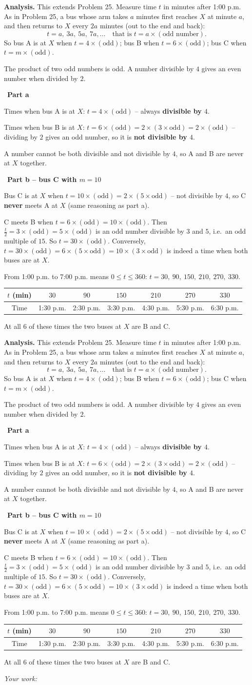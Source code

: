 \documentclass[11pt]{article}
\newif\ifsol \soltrue
\newcommand{\probsol}[1]{%
  \begin{lrbox}{\solmeasure}\begin{minipage}{\dimexpr\linewidth-24pt\relax}#1\end{minipage}\end{lrbox}%
  \ifsol
    \begin{solbox}#1\end{solbox}%
  \else
    \setlength{\solht}{\dimexpr\ht\solmeasure+\dp\solmeasure+0.85cm\relax}%
    \ifdim\solht<1.35cm\setlength{\solht}{1.35cm}\fi
    \ifdim\solht>\StudentMaxWork\setlength{\solht}{\StudentMaxWork}\fi
    \begin{tcolorbox}[colback=white,colframe=Line,boxrule=0.8pt,arc=5pt,
      left=8pt,right=8pt,top=4pt,bottom=4pt,height=\solht]{\footnotesize\color{Slate}\itshape\WorkWord}\end{tcolorbox}%
  \fi}
\newlength{\StudentMaxWork}\setlength{\StudentMaxWork}{7.5cm}
\newcommand{\step}[2]{\par\smallskip\noindent{\bfseries\color{tmBlue!85!black}\StepWord~#1.}\ {\bfseries #2}\par\nopagebreak}
\def\WorkWord{Your work:}
\def\StepWord{Step}
\begin{document}
\probsol{
\textbf{Analysis.} This extends Problem 25. Measure time $t$ in minutes after 1:00 p.m. As in Problem 25, a bus whose arm takes $a$ minutes first reaches $X$ at minute $a$, and then returns to $X$ every $2a$ minutes (out to the end and back):
\[ t=a,\ 3a,\ 5a,\ 7a,\dots \quad\text{that is } t=a\times(\text{odd number}). \]
So bus A is at $X$ when $t=4\times(\text{odd})$; bus B when $t=6\times(\text{odd})$; bus C when $t=m\times(\text{odd})$.
\begin{recallbox}The product of two odd numbers is odd. A number divisible by $4$ gives an even number when divided by $2$.\end{recallbox}

\step{1}{Part a}
Times when bus A is at $X$: $t=4\times(\text{odd})$ -- always \textbf{divisible by $4$}.\par
Times when bus B is at $X$: $t=6\times(\text{odd})=2\times(3\times\text{odd})=2\times(\text{odd})$ -- dividing by $2$ gives an odd number, so it is \textbf{not divisible by $4$}.\par
A number cannot be both divisible and not divisible by $4$, so A and B are never at $X$ together.

\step{2}{Part b -- bus C with $m=10$}
Bus C is at $X$ when $t=10\times(\text{odd})=2\times(5\times\text{odd})$ -- not divisible by $4$, so C \textbf{never} meets A at $X$ (same reasoning as part a).\par
C meets B when $t=6\times(\text{odd})=10\times(\text{odd})$. Then $\frac{t}{2}=3\times(\text{odd})=5\times(\text{odd})$ is an odd number divisible by $3$ and $5$, i.e.\ an odd multiple of $15$. So $t=30\times(\text{odd})$. Conversely, $t=30\times(\text{odd})=6\times(5\times\text{odd})=10\times(3\times\text{odd})$ is indeed a time when both buses are at $X$.\par
From 1:00 p.m. to 7:00 p.m. means $0\le t\le 360$: $t=30,\ 90,\ 150,\ 210,\ 270,\ 330$.
\begin{center}
\begin{tabular}{|c|c|c|c|c|c|c|}
\hline
\rowcolor{tmBlue!10}$t$ (min) & $30$ & $90$ & $150$ & $210$ & $270$ & $330$\\ \hline
Time & 1:30 p.m. & 2:30 p.m. & 3:30 p.m. & 4:30 p.m. & 5:30 p.m. & 6:30 p.m.\\ \hline
\end{tabular}
\end{center}
At all $6$ of these times the two buses at $X$ are B and C.

}
\end{document}
